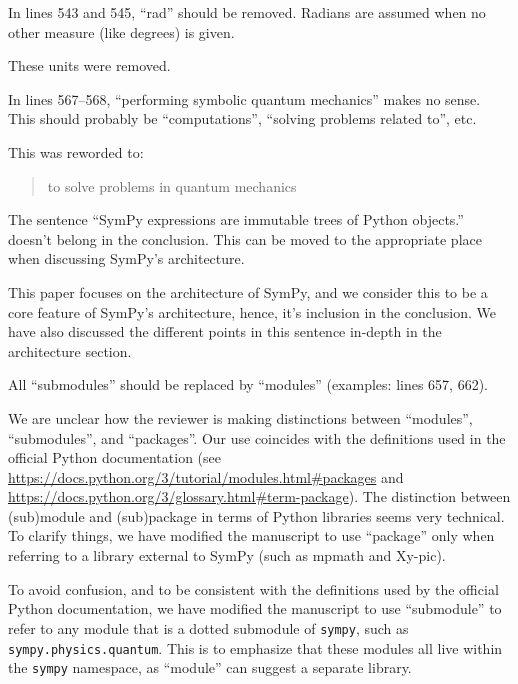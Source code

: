 \documentclass[answers,12pt]{exam}
\begin{document}
\begin{questions}
\question In lines 543 and 545, ``rad'' should be removed. Radians are assumed when no other measure (like degrees) is given.
\begin{solution}
These units were removed.
\end{solution}

\question In lines 567--568, ``performing symbolic quantum mechanics'' makes no sense. This should probably be ``computations'', ``solving problems related to'', etc.
\begin{solution}
This was reworded to:
\begin{quote}
to solve problems in quantum mechanics
\end{quote}
\end{solution}

\question The sentence ``SymPy expressions are immutable trees of Python objects.'' doesn't belong in the conclusion. This can be moved to the appropriate place when discussing SymPy's architecture.
\begin{solution}
This paper focuses on the architecture of SymPy, and we consider this to be a
core feature of SymPy's architecture, hence, it's inclusion in the conclusion.
We have also discussed the different points in this sentence in-depth in the architecture section.
\end{solution}

\question All ``submodules'' should be replaced by ``modules'' (examples:
lines 657, 662).
\label{rev1point37}
\begin{solution}
We are unclear how the reviewer is making distinctions between ``modules'',
``submodules'', and ``packages''. Our use coincides with the definitions used
in the official Python documentation (see
\url{https://docs.python.org/3/tutorial/modules.html#packages} and
\url{https://docs.python.org/3/glossary.html#term-package}). The distinction
between (sub)module and (sub)package in terms of Python libraries seems very
technical. To clarify things, we have modified the manuscript to use
``package'' only when referring to a library external to SymPy (such as
mpmath and Xy-pic).

To avoid confusion, and to be consistent with the definitions used by the
official Python documentation, we have modified the manuscript to use
``submodule'' to refer to any module that is a dotted submodule of
\texttt{sympy}, such as \texttt{sympy.physics.quantum}. This is to emphasize
that these modules all live within the \texttt{sympy} namespace, as ``module''
can suggest a separate library.
\end{solution}


\end{questions}
\end{document}
